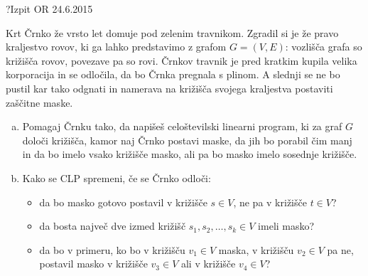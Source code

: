 \begin{naloga}{?}{Izpit OR 24.6.2015}
\begin{vprasanje}[crnko]
Krt Črnko že vrsto let domuje pod zelenim travnikom.
Zgradil si je že pravo kraljestvo rovov,
ki ga lahko predstavimo z grafom $G = (V, E)$:
vozlišča grafa so križišča rovov, povezave pa so rovi.
Črnkov travnik je pred kratkim kupila velika korporacija in se odločila,
da bo Črnka pregnala s plinom.
A slednji se ne bo pustil kar tako odgnati
in namerava na križišča svojega kraljestva postaviti zaščitne maske.

\begin{enumerate}[(a)]
\item Pomagaj Črnku tako, da napišeš celoštevilski linearni program,
ki za graf $G$ določi križišča, kamor naj Črnko postavi maske,
da jih bo porabil čim manj in da bo imelo vsako križišče masko,
ali pa bo masko imelo sosednje križišče.

\item Kako se CLP spremeni, če se Črnko odloči:
    \begin{itemize}
    \item da bo masko gotovo postavil v križišče $s \in V$,
    ne pa v križišče $t \in V$?
    \item da bosta največ dve izmed križišč $s_1, s_2, \dots, s_k \in V$
    imeli masko?
    \item da bo v primeru, ko bo v križišču $v_1 \in V$ maska,
    v križišču $v_2 \in V$ pa ne,
    postavil masko v križišče $v_3 \in V$ ali v križišče $v_4 \in V$?
    \end{itemize}
\end{enumerate}
\end{vprasanje}
\begin{odgovor}
\end{odgovor}
\end{naloga}


